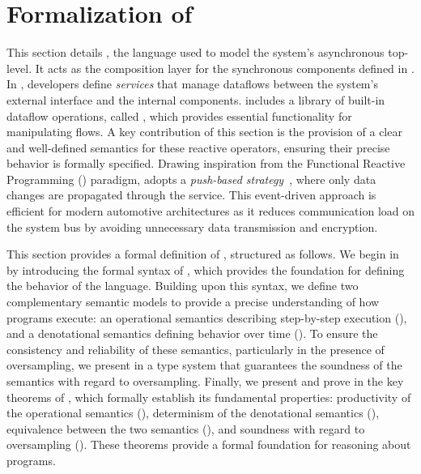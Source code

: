 \section{Formalization of \GRFRP}
\label{sec:semantics:grfrp}

This section details \GRFRP, the language used to model the system's asynchronous top-level. It acts
as the composition layer for the synchronous components defined in \GRSync. In \GRFRP, developers
define \emph{services} that manage dataflows between the system's external interface and the
internal \GRSync components.
\GRFRP includes a library of built-in dataflow operations, called \GReact,
which provides essential functionality for manipulating flows. A key contribution of this section
is the provision of a clear and well-defined semantics for these reactive operators, ensuring their
precise behavior is formally specified.
%
Drawing inspiration from the Functional Reactive Programming (\frp) paradigm, \GRFRP adopts a
\emph{push-based strategy}~\cite{DBLP:conf/haskell/Elliott09}, where only data changes are
propagated through the service. This event-driven approach is efficient for modern automotive
architectures as it reduces communication load on the system bus by avoiding unnecessary data
transmission and encryption.

This section provides a formal definition of \GRFRP, structured as follows.
%
We begin in  by introducing the formal syntax of \GRFRP, which
provides the foundation for defining the behavior of the language.
%
Building upon this syntax, we define two complementary semantic models to provide a precise
understanding of how \GRFRP programs execute: an operational semantics describing step-by-step
execution (), and a denotational semantics defining behavior over
time ().
%
To ensure the consistency and reliability of these semantics, particularly in the presence of
oversampling, we present in  a type system that guarantees
the soundness of the semantics with regard to oversampling.
%
Finally, we present and prove in  the key theorems of \GRFRP,
which formally establish its fundamental properties: productivity of the operational semantics
(), determinism of the denotational semantics
(), equivalence between the two semantics
(), and soundness with regard to oversampling
(). These theorems provide a formal foundation for
reasoning about \GRFRP programs.

